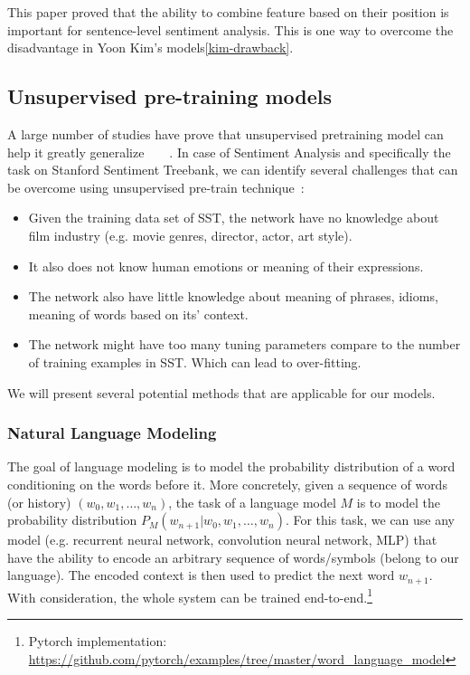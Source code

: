 This paper proved that the ability to combine feature based on their position is important for sentence-level sentiment analysis. 
This is one way to overcome the disadvantage in Yoon Kim's models\ref{kim-drawback}.


\subsection{Unsupervised pre-training models}\label{sec:unsupervised-pretrain}
A large number of studies have prove that unsupervised pretraining model can help it greatly generalize~\cite{why-unsupervised}~\cite{greedy-layer}~\cite{greedy-layer-bengio}~\cite{pretrain-1}.
In case of Sentiment Analysis and specifically the task on Stanford Sentiment Treebank, we can identify several challenges that can be overcome using unsupervised pre-train technique~\cite{why-unsupervised}:
\begin{itemize}
\item Given the training data set of SST, the network have no knowledge about film industry (e.g. movie genres, director, actor, art style). 
\item It also does not know human emotions or meaning of their expressions.
\item The network also have little knowledge about meaning of phrases, idioms, meaning of words based on its' context.
\item The network might have too many tuning parameters compare to the number of training examples in SST. 
Which can lead to over-fitting.
\end{itemize}
We will present several potential methods that are applicable for our models. 

\subsubsection{Natural Language Modeling}\label{sec:nlm}
The goal of language modeling is to model the probability distribution of a word conditioning on the words before it.
More concretely, given a sequence of words (or history) \((w_0, w_1,\ldots,w_n)\), the task of a language model \(M\) is to model the probability distribution \(P_M(w_{n+1}|w_0, w_1,\ldots,w_n)\). 
For this task, we can use any model (e.g. recurrent neural network, convolution neural network, MLP) that have the ability to encode an arbitrary sequence of words/symbols (belong to our language).
The encoded context is then used to predict the next word \(w_{n+1}\).
With consideration, the whole system can be trained end-to-end.\footnote{Pytorch implementation: \url{https://github.com/pytorch/examples/tree/master/word\_language\_model}}

